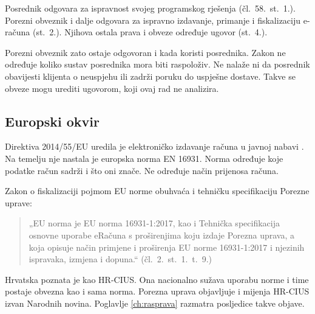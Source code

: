 Posrednik odgovara za ispravnost svojeg programskog rješenja
(čl.~58.~st.~1.). Porezni obveznik i dalje odgovara za ispravno izdavanje,
primanje i fiskalizaciju e-računa (st.~2.). Njihova ostala prava i obveze
određuje ugovor (st.~4.).

Porezni obveznik zato ostaje odgovoran i kada koristi posrednika. Zakon ne
određuje koliko sustav posrednika mora biti raspoloživ. Ne nalaže ni da
posrednik obavijesti klijenta o neuspjehu ili zadrži poruku do uspješne
dostave. Takve se obveze mogu urediti ugovorom, koji ovaj rad ne analizira.

\subsection{Europski okvir}
\label{sec:eu-okvir}

Direktiva 2014/55/EU uredila je elektroničko izdavanje računa u javnoj
nabavi \cite{eu2014direktiva55}. Na temelju nje nastala je europska norma
EN 16931. Norma određuje koje podatke račun sadrži i što oni znače. Ne
određuje način prijenosa računa.

Zakon o fiskalizaciji pojmom EU norme obuhvaća i tehničku specifikaciju
Porezne uprave:

\begin{quote}
„EU norma je EU norma 16931-1:2017, kao i Tehnička specifikacija osnovne
uporabe eRačuna s proširenjima koju izdaje Porezna uprava, a koja opisuje
način primjene i proširenja EU norme 16931-1:2017 i njezinih ispravaka,
izmjena i dopuna.“ \hfill (čl.~2.~st.~1.~t.~9.)
\end{quote}

Hrvatska  poznata je kao HR-CIUS. Ona nacionalno sužava uporabu norme
\cite{pu2026hrcius} i time postaje obvezna kao i sama norma. Porezna uprava
objavljuje i mijenja HR-CIUS izvan Narodnih novina. Poglavlje
\ref{ch:rasprava} razmatra posljedice takve objave.
